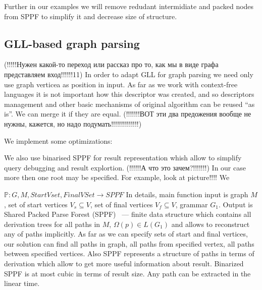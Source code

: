 \documentclass{sig-alternate} %
\begin{document}
Further in our examples we will remove redudant intermidiate and packed nodes from SPPF to simplify it and decrease size of structure.

\subsection{GLL-based graph parsing}
(!!!!!Нужен какой-то переход или рассказ про то, как мы в виде графа представляем вход!!!!!!11)
In order to adapt GLL for graph parsing we need only use graph verticea as position in input.
As far as we work with context-free languages it is not important how this descriptor was created, and so descriptors management and other basic mechanisms of original algorithm can be reused ``as is''. 
We can merge it if they are equal. (!!!!!!!ВОТ эти два предожения вообще не нужны, кажется, но надо подумать!!!!!!!!!!!!!!) 

We implement some optimizations:~\cite{FastPracticalGLL}

We also use binarised SPPF for result representation whish allow to simplify query debugging and result explortion. (!!!!!!А что это  зачем?!!!!!!!)
In our case more then one root may be specified. For example, look at picture!!!! 
We 

$\mathbb{P}:G, M, StartVset, FinalVSet \rightarrow SPPF$
In details, main function input is graph $M$, set of start vertices $V_s\subseteq V$, set of final vertices $V_f\subseteq V$, grammar $G_1$.
Output is Shared Packed Parse Forest (SPPF)~\cite{SPPF} --- finite data structure which contains all derivation trees for all paths in $M$, $\Omega(p) \in L(G_1)$ and allows to reconstruct any of paths implicitly.
As far as we can specify sets of start and final vertices, our solution can find all paths in graph, all paths from specified vertex, all paths between specified vertices. 
Also SPPF represents a structure of paths in terms of derivation which allow to get more useful 
information about result. 
Binarized SPPF is at most cubic in terms of result size. 
Any path can be extracted in the linear time.









\end{document}

